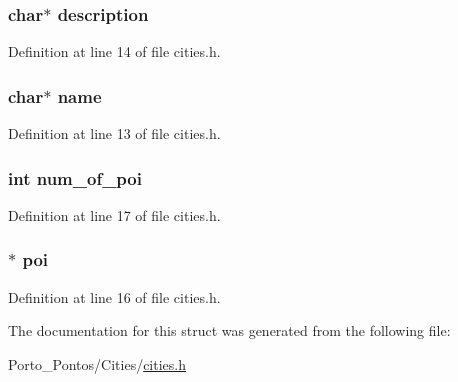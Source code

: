 \hypertarget{structcity_a8444d6e0dfe2bbab0b5e7b24308f1559}{}
\subsubsection[{description}]{\setlength{\rightskip}{0pt plus 5cm}char$\ast$ description}\label{structcity_a8444d6e0dfe2bbab0b5e7b24308f1559}


Definition at line 14 of file cities.\+h.

\hypertarget{structcity_a5ac083a645d964373f022d03df4849c8}{}
\subsubsection[{name}]{\setlength{\rightskip}{0pt plus 5cm}char$\ast$ name}\label{structcity_a5ac083a645d964373f022d03df4849c8}


Definition at line 13 of file cities.\+h.

\hypertarget{structcity_aead4207565357706b17fe7e9414bafac}{}
\subsubsection[{num\+\_\+of\+\_\+poi}]{\setlength{\rightskip}{0pt plus 5cm}int num\+\_\+of\+\_\+poi}\label{structcity_aead4207565357706b17fe7e9414bafac}


Definition at line 17 of file cities.\+h.

\hypertarget{structcity_a0c8507eac9b0547e9b75772dae17b800}{}
\subsubsection[{poi}]{$\ast$ {\bf poi}}\label{structcity_a0c8507eac9b0547e9b75772dae17b800}


Definition at line 16 of file cities.\+h.



The documentation for this struct was generated from the following file\+:\begin{DoxyCompactItemize}
\item 
Porto\+\_\+\+Pontos/\+Cities/\hyperlink{cities_8h}{cities.\+h}\end{DoxyCompactItemize}
